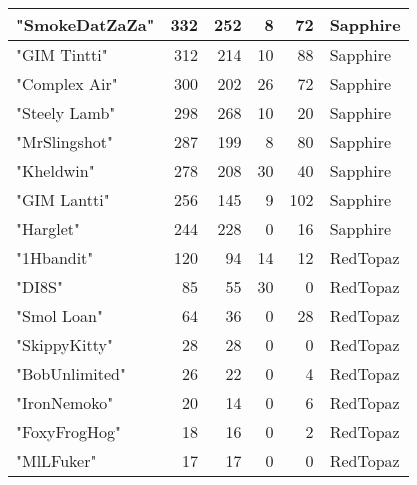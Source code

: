\documentclass{article}
\begin{document}
\begin{table}[htbp]
\begin{tabular}{|l|r|r|r|r|l|}
"SmokeDatZaZa" & 332 & 252 & 8 & 72 & Sapphire \\ \hline
"GIM Tintti" & 312 & 214 & 10 & 88 & Sapphire \\ \hline
"Complex Air" & 300 & 202 & 26 & 72 & Sapphire \\ \hline
"Steely Lamb" & 298 & 268 & 10 & 20 & Sapphire \\ \hline
"MrSlingshot" & 287 & 199 & 8 & 80 & Sapphire \\ \hline
"Kheldwin" & 278 & 208 & 30 & 40 & Sapphire \\ \hline
"GIM Lantti" & 256 & 145 & 9 & 102 & Sapphire \\ \hline
"Harglet" & 244 & 228 & 0 & 16 & Sapphire \\ \hline
"1Hbandit" & 120 & 94 & 14 & 12 & RedTopaz \\ \hline
"DI8S" & 85 & 55 & 30 & 0 & RedTopaz \\ \hline
"Smol Loan" & 64 & 36 & 0 & 28 & RedTopaz \\ \hline
"SkippyKitty" & 28 & 28 & 0 & 0 & RedTopaz \\ \hline
"BobUnlimited" & 26 & 22 & 0 & 4 & RedTopaz \\ \hline
"IronNemoko" & 20 & 14 & 0 & 6 & RedTopaz \\ \hline
"FoxyFrogHog" & 18 & 16 & 0 & 2 & RedTopaz \\ \hline
"MlLFuker" & 17 & 17 & 0 & 0 & RedTopaz \\ \hline
\end{tabular}
\end{table}
\end{document}
